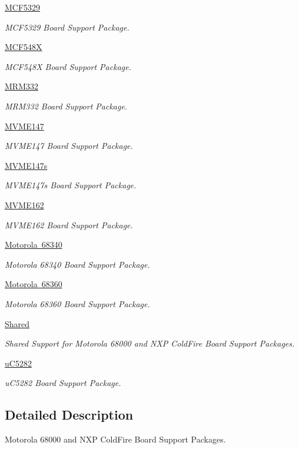 \begin{DoxyCompactItemize}
\mbox{\hyperlink{group__RTEMSBSPsM68kMCF5329}{M\+C\+F5329}}
\begin{DoxyCompactList}\small\item\em M\+C\+F5329 Board Support Package. \end{DoxyCompactList}\item 
\mbox{\hyperlink{group__RTEMSBSPsM68kGenMCF548X}{M\+C\+F548X}}
\begin{DoxyCompactList}\small\item\em M\+C\+F548X Board Support Package. \end{DoxyCompactList}\item 
\mbox{\hyperlink{group__RTEMSBSPsM68kMRM332}{M\+R\+M332}}
\begin{DoxyCompactList}\small\item\em M\+R\+M332 Board Support Package. \end{DoxyCompactList}\item 
\mbox{\hyperlink{group__RTEMSBSPsM68kMVME147}{M\+V\+M\+E147}}
\begin{DoxyCompactList}\small\item\em M\+V\+M\+E147 Board Support Package. \end{DoxyCompactList}\item 
\mbox{\hyperlink{group__RTEMSBSPsM68kMVME147s}{M\+V\+M\+E147s}}
\begin{DoxyCompactList}\small\item\em M\+V\+M\+E147s Board Support Package. \end{DoxyCompactList}\item 
\mbox{\hyperlink{group__RTEMSBSPsM68kMVME162}{M\+V\+M\+E162}}
\begin{DoxyCompactList}\small\item\em M\+V\+M\+E162 Board Support Package. \end{DoxyCompactList}\item 
\mbox{\hyperlink{group__RTEMSBSPsM68kGen68340}{Motorola 68340}}
\begin{DoxyCompactList}\small\item\em Motorola 68340 Board Support Package. \end{DoxyCompactList}\item 
\mbox{\hyperlink{group__RTEMSBSPsM68kGen68360}{Motorola 68360}}
\begin{DoxyCompactList}\small\item\em Motorola 68360 Board Support Package. \end{DoxyCompactList}\item 
\mbox{\hyperlink{group__RTEMSBSPsM68kShared}{Shared}}
\begin{DoxyCompactList}\small\item\em Shared Support for Motorola 68000 and N\+XP Cold\+Fire Board Support Packages. \end{DoxyCompactList}\item 
\mbox{\hyperlink{group__RTEMSBSPsM68kUC5282}{u\+C5282}}
\begin{DoxyCompactList}\small\item\em u\+C5282 Board Support Package. \end{DoxyCompactList}\end{DoxyCompactItemize}


\subsection{Detailed Description}
Motorola 68000 and N\+XP Cold\+Fire Board Support Packages. 

